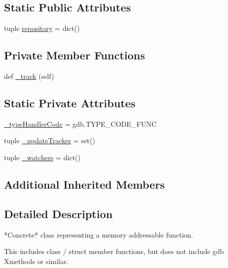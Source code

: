 \subsection*{Static Public Attributes}
\begin{DoxyCompactItemize}
\item 
tuple \hyperlink{classmemoryoracle_1_1instance_1_1Function_ad6a293ac59a9179f3d084476cabd6caa}{repository} = dict()
\end{DoxyCompactItemize}
\subsection*{Private Member Functions}
\begin{DoxyCompactItemize}
\item 
def \hyperlink{classmemoryoracle_1_1instance_1_1Function_a7a9986e71536747bc6c64db861de1c81}{\+\_\+track} (self)
\end{DoxyCompactItemize}
\subsection*{Static Private Attributes}
\begin{DoxyCompactItemize}
\item 
\hyperlink{classmemoryoracle_1_1instance_1_1Function_abc22bb1a3c502c21fb9bc5fc321b1fb1}{\+\_\+type\+Handler\+Code} = gdb.\+T\+Y\+P\+E\+\_\+\+C\+O\+D\+E\+\_\+\+F\+U\+N\+C
\item 
tuple \hyperlink{classmemoryoracle_1_1instance_1_1Function_a1dca5163bcc7eef307b3815cd1442214}{\+\_\+update\+Tracker} = set()
\item 
tuple \hyperlink{classmemoryoracle_1_1instance_1_1Function_a3ef013df70602c9cf0dcb8966d7eac99}{\+\_\+watchers} = dict()
\end{DoxyCompactItemize}
\subsection*{Additional Inherited Members}


\subsection{Detailed Description}
\begin{DoxyVerb}*Concrete* class representing a memory addressable function.

This includes class / struct member functions, but does not
include gdb Xmethods or similar.
\end{DoxyVerb}
 

